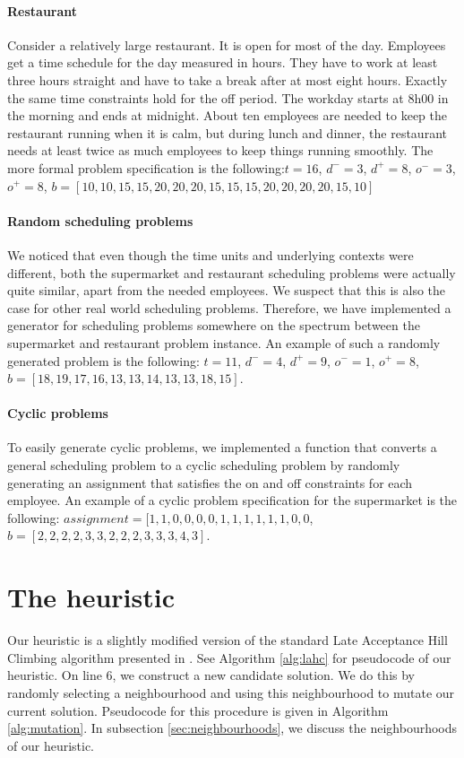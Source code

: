 \documentclass[]{article}
\begin{document}
\paragraph{Restaurant}
Consider a relatively large restaurant. It is open for most of the day. Employees get a time schedule for the day measured in hours. They have to work at least three hours straight and have to take a break after at most eight hours. Exactly the same time constraints hold for the off period. The workday starts at 8h00 in the morning and ends at midnight. About ten employees are needed to keep the restaurant running when it is calm, but during lunch and dinner, the restaurant needs at least twice as much employees to keep things running smoothly.
The more formal problem specification is the following:$t=16$, $d^- = 3$, $d^+ = 8$, $o^- = 3$, $o^+ = 8$, $b = [10,10,15,15,20,20,20,15,15,15,20,20,20,20,15,10]$

\paragraph{Random scheduling problems}
We noticed that even though the time units and underlying contexts were different, both the supermarket and restaurant scheduling problems were actually quite similar, apart from the needed employees. We suspect that this is also the case for other real world scheduling problems. Therefore, we have implemented a generator for scheduling problems somewhere on the spectrum between the supermarket and restaurant problem instance. An example of such a randomly generated problem is the following: $t=11$, $d^- = 4$, $d^+ = 9$, $o^- = 1$, $o^+ = 8$, $b = [18,19,17,16,13,13,14,13,13,18,15]$.

\paragraph{Cyclic problems}
To easily generate cyclic problems, we implemented a function that converts a general scheduling problem to a cyclic scheduling problem by randomly generating an assignment that satisfies the on and off constraints for each employee.
An example of a cyclic problem specification for the supermarket is the following:
$assignment = [1,1,0,0,0,0,1,1,1,1,1,1,0,0$, $b = [2,2,2,2,3,3,2,2,2,3,3,3,4,3]$.

\section{The heuristic}
Our heuristic is a slightly modified version of the standard Late Acceptance Hill Climbing algorithm presented in \cite{burke2012late}. See Algorithm \ref{alg:lahc} for pseudocode of our heuristic. On line 6, we construct a new candidate solution. We do this by randomly selecting a neighbourhood and using this neighbourhood to mutate our current solution. Pseudocode for this procedure is given in Algorithm \ref{alg:mutation}. In subsection \ref{sec:neighbourhoods}, we discuss the neighbourhoods of our heuristic.
\end{document}
